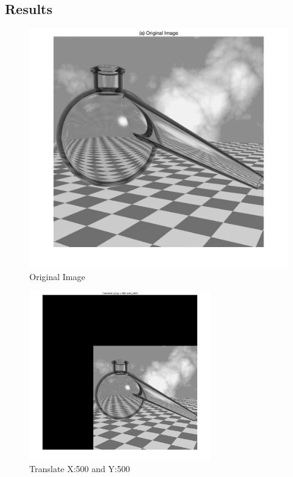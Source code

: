 \documentclass[11pt,oneside]{book}
\begin{document}
\subsection{Results}
\begin{figure}[!htb]
   \centering  
   \includegraphics[width=1\textwidth]{images/6/translate.jpg}
   \caption{Original Image}
\end{figure}
\newpage
\begin{figure}[!htb]
   \centering  
   \includegraphics[width=0.7\textwidth]{images/6/translate_.jpg}
   \caption{Translate X:500 and Y:500}
\end{figure}
\end{document}
